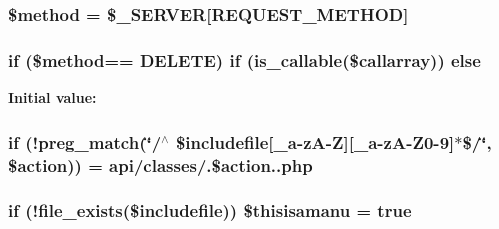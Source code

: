 \subsubsection[{\$method}]{\setlength{\rightskip}{0pt plus 5cm}\$method = \$\+\_\+\+S\+E\+R\+V\+E\+R\mbox{[}\textquotesingle{}R\+E\+Q\+U\+E\+S\+T\+\_\+\+M\+E\+T\+H\+O\+D\textquotesingle{}\mbox{]}}\label{a00082_a12661b2fc0f57f97e30a1620889ce9c6}
\hypertarget{a00082_a1d3defe87c04d4fc1443739d3831ebfe}{}
\subsubsection[{else}]{\setlength{\rightskip}{0pt plus 5cm}if (\$method== \textquotesingle{}D\+E\+L\+E\+T\+E\textquotesingle{}) if (is\+\_\+callable(\$callarray)) else}\label{a00082_a1d3defe87c04d4fc1443739d3831ebfe}
{\bfseries Initial value\+:}
\hypertarget{a00082_a1c1b7d1432c2e06063bf8f9ad29ba19d}{}
\subsubsection[{\$includefile}]{\setlength{\rightskip}{0pt plus 5cm}if (!preg\+\_\+match(\char`\"{}/$^\wedge$ \$includefile\mbox{[}\+\_\+a-\/z\+A-\/Z\mbox{]}\mbox{[}\+\_\+a-\/z\+A-\/Z0-\/9\mbox{]}$\ast$\$/\char`\"{}, \$action)) = \textquotesingle{}api/classes/\textquotesingle{}.\$action.\textquotesingle{}.php\textquotesingle{}}\label{a00082_a1c1b7d1432c2e06063bf8f9ad29ba19d}
\hypertarget{a00082_a36df20dc9373bab32c6e4ff30b9093c3}{}
\subsubsection[{\$thisisamanu}]{\setlength{\rightskip}{0pt plus 5cm}if (!file\+\_\+exists(\$includefile)) \$thisisamanu = true}\label{a00082_a36df20dc9373bab32c6e4ff30b9093c3}
\hypertarget{a00082_a0a2d1b1b87dbb189b9243f333ad904f3}{}
